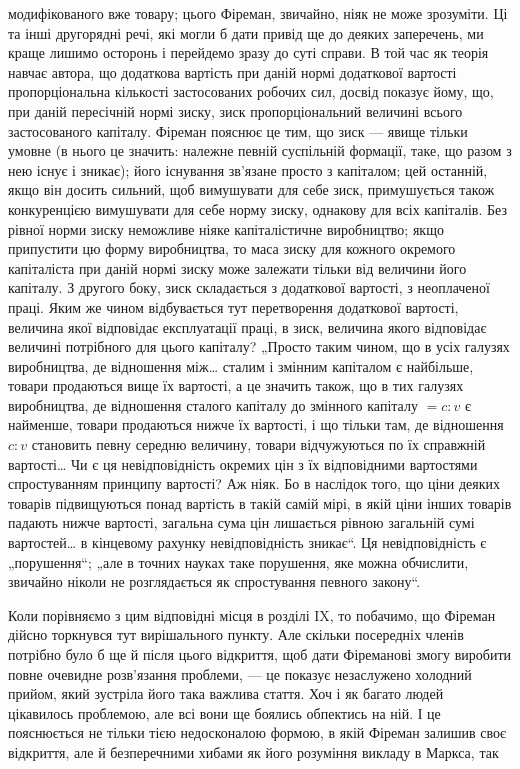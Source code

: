 \parcont{}  %
модифікованого вже товару; цього Фіреман, звичайно, ніяк не
може зрозуміти. Ці та інші другорядні речі, які могли б дати
привід ще до деяких заперечень, ми краще лишимо осторонь
і перейдемо зразу до суті справи. В той час як теорія навчає
автора, що додаткова вартість при даній нормі додаткової вартості
пропорціональна кількості застосованих робочих сил, досвід
показує йому, що, при даній пересічній нормі зиску, зиск
пропорціональний величині всього застосованого капіталу. Фіреман
пояснює це тим, що зиск — явище тільки умовне (в нього
це значить: належне певній суспільній формації, таке, що разом
з нею існує і зникає); його існування зв’язане просто з капіталом;
цей останній, якщо він досить сильний, щоб вимушувати
для себе зиск, примушується також конкуренцією вимушувати
для себе норму зиску, однакову для всіх капіталів. Без рівної
норми зиску неможливе ніяке капіталістичне виробництво; якщо
припустити цю форму виробництва, то маса зиску для кожного
окремого капіталіста при даній нормі зиску може залежати тільки
від величини його капіталу. З другого боку, зиск складається
з додаткової вартості, з неоплаченої праці. Яким же чином відбувається
тут перетворення додаткової вартості, величина якої
відповідає експлуатації праці, в зиск, величина якого відповідає
величині потрібного для цього капіталу? „Просто таким чином,
що в усіх галузях виробництва, де відношення між\dots{} сталим
і змінним капіталом є найбільше, товари продаються вище їх
вартості, а це значить також, що в тих галузях виробництва,
де відношення сталого капіталу до змінного капіталу $= c : v$ є
найменше, товари продаються нижче їх вартості, і що тільки
там, де відношення $c : v$ становить певну середню величину,
товари відчужуються по їх справжній вартості\dots{} Чи є ця невідповідність
окремих цін з їх відповідними вартостями спростуванням
принципу вартості? Аж ніяк. Бо в наслідок того, що
ціни деяких товарів підвищуються понад вартість в такій самій
мірі, в якій ціни інших товарів падають нижче вартості, загальна
сума цін лишається рівною загальній сумі вартостей\dots{}
в кінцевому рахунку невідповідність зникає“. Ця невідповідність
є „порушення“; „але в точних науках таке порушення, яке можна
обчислити, звичайно ніколи не розглядається як спростування
певного закону“.

Коли порівняємо з цим відповідні місця в розділі IX, то побачимо,
що Фіреман дійсно торкнувся тут вирішального пункту.
Але скільки посередніх членів потрібно було б ще й після цього
відкриття, щоб дати Фіреманові змогу виробити повне очевидне
розв’язання проблеми, — це показує незаслужено холодний
прийом, який зустріла його така важлива стаття. Хоч і як багато
людей цікавилось проблемою, але всі вони ще боялись обпектись
на ній. І це пояснюється не тільки тією недосконалою
формою, в якій Фіреман залишив своє відкриття, але й безперечними
хибами як його розуміння викладу в Маркса, так
\parbreak{}  %
